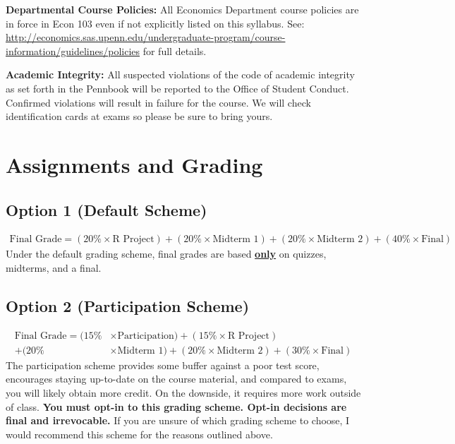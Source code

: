 \documentclass[11pt, letterpaper]{article}
\begin{document}
\medskip

\noindent \textbf{Departmental Course Policies: } 
All Economics Department course policies are in force in Econ 103 even if not explicitly listed on this syllabus. 
See: \url{http://economics.sas.upenn.edu/undergraduate-program/course-information/guidelines/policies} for full details. 

\bigskip

\noindent \textbf{Academic Integrity: } 
All suspected violations of the code of academic integrity as set forth in the Pennbook will be reported to the Office of Student Conduct. 
Confirmed violations will result in failure for the course. 
We will check identification cards at exams so please be sure to bring yours.

\medskip

\section*{Assignments and Grading}
	\subsection*{Option 1 (Default Scheme)}
		\begin{align*}
		\text{Final Grade} = (20\% \times \text{R Project}) + (20\% \times \text{Midterm 1}) + 
		(20\% \times \text{Midterm 2}) + (40\% \times \text{Final})
		\end{align*}
	Under the default grading scheme, final grades are based \textbf{\underline{only}} on quizzes, midterms, and a final.

	\subsection*{Option 2 (Participation Scheme)}
		\begin{align*}
		\text{Final Grade} = (15\% &\times \text{Participation}) + (15\% \times \text{R Project}) 
		\\
		+ (20\% &\times \text{Midterm 1}) + (20\% \times \text{Midterm 2}) + (30\% \times \text{Final})
		\end{align*}
	The participation scheme provides some buffer against a poor test score, encourages staying up-to-date on the course material, and compared to exams, you will likely obtain more credit. 
	On the downside, it requires more work outside of class. 
	\textbf{You must opt-in to this grading scheme. Opt-in decisions are final and irrevocable.} 
	If you are unsure of which grading scheme to choose, I would recommend this scheme for the reasons outlined above.
\end{document}
